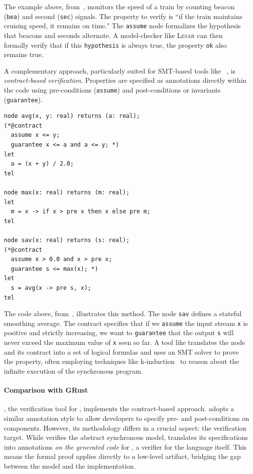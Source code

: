 The example above, from~\cite{TR-2018-11}, monitors the speed of a train by counting beacon
(\texttt{bea}) and second (\texttt{sec}) signals. The property to verify is ``if the train maintains
cruising speed, it remains on time." The \texttt{assume} node formalizes the hypothesis that beacons
and seconds alternate. A model-checker like \textsc{Lesar} can then formally verify that if this
\texttt{hypothesis} is always true, the property \texttt{ok} also remains true.

A complementary approach, particularly suited for SMT-based tools like
\Kind~\cite{DBLP:conf/cav/ChampionMST16}, is \emph{contract-based verification}. Properties are
specified as annotations directly within the code using pre-conditions (\texttt{assume}) and
post-conditions or invariants (\texttt{guarantee}).

\begin{lstlisting}[basicstyle=\ttfamily\footnotesize\color{BlackText}]
node avg(x, y: real) returns (a: real);
(*@contract
  assume x <= y;
  guarantee x <= a and a <= y; *)
let
  a = (x + y) / 2.0;
tel

node max(x: real) returns (m: real);
let
  m = x -> if x > pre x then x else pre m;
tel

node sav(x: real) returns (s: real);
(*@contract
  assume x > 0.0 and x > pre x;
  guarantee s <= max(x); *)
let
  s = avg(x -> pre s, x);
tel
\end{lstlisting}

The code above, from~\cite{DBLP:conf/cav/ChampionMST16}, illustrates this method. The node
\texttt{sav} defines a stateful smoothing average. The contract specifies that if we \texttt{assume}
the input stream \texttt{x} is positive and strictly increasing, we want to \texttt{guarantee} that
the output \texttt{s} will never exceed the maximum value of \texttt{x} seen so far. A tool like
\Kind translates the node and its contract into a set of logical formulas and uses an SMT solver to
prove the property, often employing techniques like k-induction~\cite{DBLP:conf/fmcad/SheeranSS00}
to reason about the infinite execution of the synchronous program.

\paragraph*{Comparison with GRust}
\GReusot, the verification tool for \GRust, implements the contract-based approach. \GReusot adopts
a similar annotation style to allow developers to specify pre- and post-conditions on \GRSync
components. However, its methodology differs in a crucial aspect: the verification target. While
\Kind verifies the abstract synchronous model, \GReusot translates its specifications into
annotations \emph{on the generated code} for \Creusot, a verifier for the \Rust language itself.
This means the formal proof applies directly to a low-level artifact, bridging the gap between the
model and the implementation.

